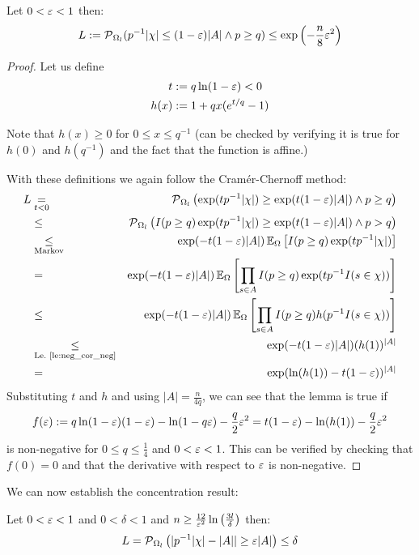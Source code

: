 \begin{lemma}\label{le:lower_tail}
Let $0 < \varepsilon < 1$ then:
\[
  L := \operatorname{\mathcal P}_{\Omega_l} ( p^{-1} |\chi| \leq (1-\varepsilon)|A| \wedge p \geq q) \leq
    \exp\left(-\frac{n}{8} \varepsilon^2\right)
\]
\end{lemma}
\begin{proof}
Let us define
\begin{align*}
  t & := q \ln(1-\varepsilon) < 0 \\
  h(x) & := 1+q x (e^{t/q}-1)  
\end{align*}

Note that $h(x) \geq 0$ for $0 \leq x \leq q^{-1}$ (can be checked by verifying it is true for
$h(0)$ and $h(q^{-1})$ and the fact that the function is affine.)

With these definitions we again follow the Cram\'{e}r-Chernoff method:
{\allowdisplaybreaks
\begin{eqnarray*}
  L & \underset{t<0}{=} & \operatorname{\mathcal P}_{\Omega_l} \left( \exp(t p^{-1} |\chi|) \geq
    \exp(t (1-\varepsilon)|A|) \wedge p \geq q \right) \\
    & \leq & \operatorname{\mathcal P}_{\Omega_l} \left( I(p \geq q) \exp(t p^{-1} |\chi|) \geq
    \exp(t (1-\varepsilon)|A|) \wedge p > q \right) \\
    & \underset{\textrm{Markov}}{\leq} & \exp( -t (1-\varepsilon) |A| )
    \operatorname{\mathbb E}_\Omega \left[ I(p \geq q) \exp ( t p^{-1} |\chi| ) \right] \\
    & = & \exp( -t (1-\varepsilon) |A| ) \operatorname{\mathbb E}_\Omega \left[ \prod_{s \in A} I(p \geq q) 
      \exp ( t p^{-1} I(s \in \chi) ) \right] \\
    & \leq & \exp( -t (1-\varepsilon) |A| ) \operatorname{\mathbb E}_\Omega 
      \left[ \prod_{s \in A} I(p \geq q) h( p^{-1} I(s \in \chi) ) \right] \\
    & \underset{\textrm{Le.~\ref{le:neg_cor_neg}}}{\leq} & \exp( -t (1-\varepsilon) |A| ) (h(1))^{|A|} \\
    & = & \exp( \ln(h(1)) -t (1-\varepsilon) )^{|A|}
\end{eqnarray*}
}
Substituting $t$ and $h$ and using $|A| = \frac{n}{4q}$, we can see that the lemma is true if
\[
  f(\varepsilon) := q \ln(1-\varepsilon) (1-\varepsilon) -\ln(1 - q \varepsilon) - \frac{q}{2}\varepsilon^2 =
  t (1-\varepsilon) - \ln(h(1)) - \frac{q}{2} \varepsilon^2
\]
is non-negative for $0 \leq q \leq \frac{1}{4}$ and $0 < \varepsilon < 1$.
This can be verified by checking that $f(0) = 0$ and that the derivative with respect to $\varepsilon$ is
non-negative.
\end{proof}
We can now establish the concentration result:
\begin{theorem}\label{th:concentration}
Let $0 < \varepsilon < 1$ and $0 < \delta < 1$ and
$n \geq \frac{12}{\varepsilon^2} \ln\left(\frac{3l}{\delta}\right)$ then:
\[
  L = \operatorname{\mathcal P}_{\Omega_l} \left( | p^{-1} |\chi| - |A| | \geq \varepsilon |A| \right) \leq \delta
\]
\end{theorem}
